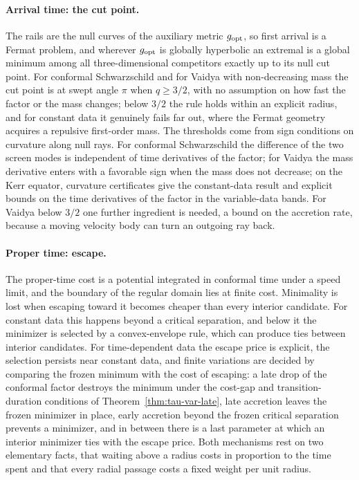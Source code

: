 \documentclass[aip,jmp,amsmath,amssymb,reprint]{revtex4-2}
\newcommand{\gopt}{g_{\rm opt}}
\theoremstyle{plain}
\theoremstyle{definition}
\begin{document}
\paragraph{Arrival time: the cut point.} The rails are the null curves of the auxiliary metric $\gopt$, so
first arrival is a Fermat problem, and wherever $\gopt$ is globally hyperbolic an extremal is a global
minimum among all three-dimensional competitors exactly up to its null cut point. For conformal
Schwarzschild and for Vaidya with non-decreasing mass the cut point is at swept angle $\pi$ when
$q\ge3/2$, with no assumption on how fast the factor or the mass changes; below $3/2$ the rule holds
within an explicit radius, and for constant data it genuinely fails far out, where the Fermat geometry
acquires a repulsive first-order mass. The thresholds come from sign conditions on curvature along null rays.
For conformal Schwarzschild the difference of the two screen modes is independent of time derivatives
of the factor; for Vaidya the mass derivative enters with a favorable sign when the mass does not
decrease; on the Kerr equator, curvature certificates give the constant-data result and explicit bounds
on the time derivatives of the factor in the variable-data bands. For Vaidya below $3/2$ one further ingredient is
needed, a bound on the accretion rate, because a moving velocity body can turn an outgoing ray back.

\paragraph{Proper time: escape.} The proper-time cost is a potential integrated in conformal time under a
speed limit, and the boundary of the regular domain lies at finite cost. Minimality is lost when
escaping toward it becomes cheaper than every interior candidate. For constant data this happens
beyond a critical separation, and below it the minimizer is selected by a convex-envelope rule, which
can produce ties between interior candidates. For time-dependent data the escape price is explicit,
the selection persists near constant data, and finite variations are decided by comparing the frozen
minimum with the cost of escaping: a late drop of the conformal factor destroys the minimum under the cost-gap and
transition-duration conditions of Theorem~\ref{thm:tau-var-late}, late
accretion leaves the frozen minimizer in place, early accretion beyond the frozen critical separation
prevents a minimizer, and in between there is a last parameter at which an interior minimizer ties
with the escape price. Both mechanisms rest on two elementary facts, that waiting above a radius costs
in proportion to the time spent and that every radial passage costs a fixed weight per unit radius.
\end{document}
